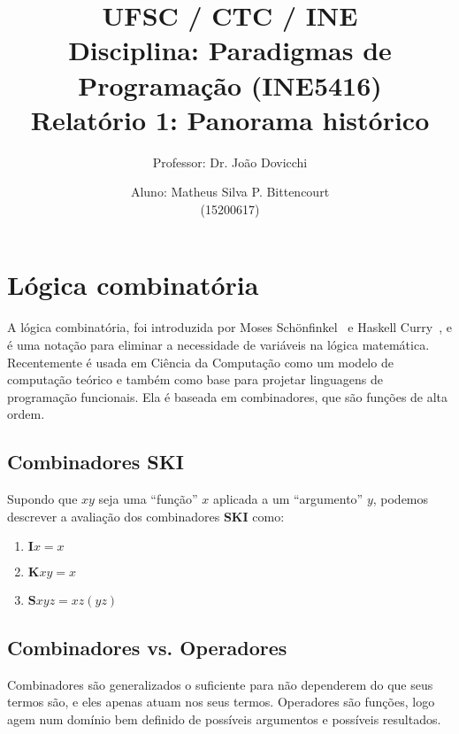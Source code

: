 \documentclass[letterpaper,twocolumn,10pt]{article}
\begin{document}
\title{
	\large \rm UFSC / CTC / INE\\
	\large \rm Disciplina: Paradigmas de Programação (INE5416)\\
	\Large \bf Relatório 1: Panorama histórico
}

\author{
	Professor: Dr. João Dovicchi\\
	\and
	Aluno: Matheus Silva P. Bittencourt\\(15200617)
}

\maketitle

\thispagestyle{empty} %

\section{Lógica combinatória}

A lógica combinatória, foi introduzida por Moses Schönfinkel~\cite{Schonfinkel}
e Haskell Curry~\cite{Curry}, e é uma notação para eliminar a necessidade de
variáveis na lógica matemática. Recentemente é usada em Ciência da Computação
como um modelo de computação teórico e também como base para projetar
linguagens de programação funcionais. Ela é baseada em combinadores, que são
funções de alta ordem.

\subsection*{Combinadores SKI}

Supondo que \(xy\) seja uma ``função'' \(x\) aplicada a um ``argumento'' \(y\),
podemos descrever a avaliação dos combinadores \textbf{SKI} como:

\begin{enumerate}
	\item \(\mathbf{I}x = x\)
	\item \(\mathbf{K}xy = x\)
	\item \(\mathbf{S}xyz = xz(yz)\)
\end{enumerate}

\subsection*{Combinadores vs. Operadores}

Combinadores são generalizados o suficiente para não dependerem do que seus
termos são, e eles apenas atuam nos seus termos. Operadores são funções, logo
agem num domínio bem definido de possíveis argumentos e possíveis resultados.
\end{document}
